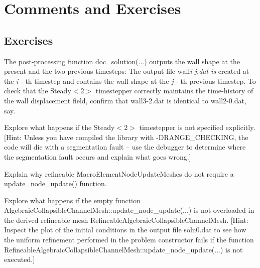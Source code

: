  

\hypertarget{index_comments}{}\section{Comments and Exercises}\label{index_comments}
\hypertarget{index_ex}{}\subsection{Exercises}\label{index_ex}

\begin{DoxyEnumerate}
\item The post-\/processing function {\ttfamily doc\+\_\+solution}(...) outputs the wall shape at the present and the two previous timesteps\+: The output file {\ttfamily wall{\itshape i-\/{\itshape j}.{\ttfamily dat} is} created} at the {\itshape i} -\/ th timestep and contains the wall shape at the {\itshape j} -\/ th previous timestep. To check that the {\ttfamily Steady$<$2$>$} timestepper correctly maintains the time-\/history of the wall displacement field, confirm that {\ttfamily wall3-\/2.\+dat} is identical to {\ttfamily wall2-\/0.\+dat}, say. ~\newline
~\newline

\item Explore what happens if the {\ttfamily Steady$<$2$>$} timestepper is not specified explicitly. \mbox{[}Hint\+: Unless you have compiled the library with {\ttfamily -\/\+D\+R\+A\+N\+G\+E\+\_\+\+C\+H\+E\+C\+K\+I\+NG}, the code will die with a segmentation fault -- use the debugger to determine where the segmentation fault occurs and explain what goes wrong.\mbox{]} ~\newline
~\newline

\item Explain why refineable {\ttfamily Macro\+Element\+Node\+Update\+Meshes} do not require a {\ttfamily update\+\_\+node\+\_\+update()} function. ~\newline
~\newline

\item Explore what happens if the empty function {\ttfamily Algebraic\+Collapsible\+Channel\+Mesh\+::update\+\_\+node\+\_\+update}(...) is not overloaded in the derived refineable mesh {\ttfamily Refineable\+Algebraic\+Collapsible\+Channel\+Mesh}. \mbox{[}Hint\+: Inspect the plot of the initial conditions in the output file {\ttfamily soln0.\+dat} to see how the uniform refinement performed in the problem constructor fails if the function {\ttfamily Refineable\+Algebraic\+Collapsible\+Channel\+Mesh\+::update\+\_\+node\+\_\+update}(...) is not executed.\mbox{]}
\end{DoxyEnumerate}



